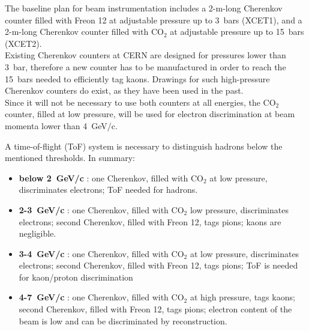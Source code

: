 The baseline plan for beam instrumentation includes a 2-m-long
Cherenkov  counter filled with Freon 12 at adjustable pressure up to
3~bars (XCET1), and a  2-m-long  
 Cherenkov  counter filled with CO$_2$ at adjustable pressure up to
 15~bars (XCET2).\\
Existing Cherenkov counters at CERN are designed for pressures lower than  3~bar, therefore a new counter has to be manufactured in order to reach the 15~bars needed to efficiently tag kaons. Drawings for such high-pressure Cherenkov counters do exist, as they have been %
used in the past. \\
%
Since it will not be necessary to use both counters at all energies, the CO$_2$
counter, filled at low pressure,  will be used for electron discrimination at beam momenta lower
than 4~GeV/c.  

A time-of-flight (ToF) system  is  necessary   to distinguish hadrons below the mentioned thresholds.
%
In summary:
\begin{itemize}
\item {\bf below 2~GeV/c} : one Cherenkov, filled with CO$_2$ at low
  pressure, discriminates electrons; ToF needed for hadrons.
\item {\bf 2-3~GeV/c} : one Cherenkov, filled with CO$_2$ low
  pressure, discriminates electrons; second Cherenkov, filled with
  Freon 12, tags pions; kaons are negligible.
\item {\bf 3-4~GeV/c} : one Cherenkov, filled with CO$_2$ at low
  pressure, discriminates electrons; second  Cherenkov, filled with
  Freon 12, tags pions; ToF is needed for kaon/proton discrimination
\item {\bf 4-7~GeV/c} : one Cherenkov, filled with CO$_2$ at high
  pressure, tags kaons; second  Cherenkov, filled with
  Freon 12, tags pions; electron content of the beam is low and can be
  discriminated by reconstruction.
\end{itemize}

